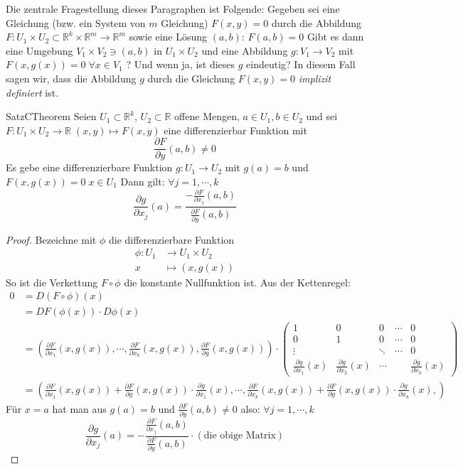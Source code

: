 Die zentrale Fragestellung dieses Paragraphen ist Folgende: Gegeben sei eine Gleichung (bzw. ein System von $ m $ Gleichung)
$ F (x,y) = 0 $ durch die Abbildung $ F: U_1 \times U_2 \subset \mathbb{R}^{k} \times \mathbb{R}^m  \to \mathbb{R}^m  $ sowie 
eine Lösung $ (a,b) $: $ F \left( a,b \right) = 0 $ Gibt es dann eine Umgebung $ V_1 \times V_2 \ni (a,b)  $ in $ U_1 \times U_2 $ 
und eine Abbildung $ g: V_1 \to V_2 $ mit $ F \left( x, g \left(x\right)  \right) = 0 \; \forall x \in  V_1 $ ? Und wenn ja, ist 
dieses $ g $ eindeutig? In diesem Fall sagen wir, dass die Abbildung $ g $ durch die Gleichung $ F (x,y) = 0 $ \textit{implizit
 definiert} ist. 
 \begin{ibox}[44]{Satz}{CTheorem}
     Seien $ U_1 \subset \mathbb{R}^{k},\, U_2 \subset \mathbb{R}  $ offene Mengen, $ a \in U_1, b \in U_2 $ und sei 
		 $ F: U_{1} \times U_2 \to \mathbb{R} \; (x,y) \mapsto F (x,y) $ eine differenzierbar Funktion mit 
		 $$ \frac{\partial F}{\partial y} (a,b) \neq 0 $$
		 Es gebe eine differenzierbare Funktion $ g: U_1 \to U_2  $ mit $ g (a) = b $ und $ F \left( x,g (x) \right) = 0 \; x \in U_1 $ 
		 Dann gilt: $ \forall j = 1, \cdots,  k $ 
		 $$ \frac{\partial g}{\partial x_j} (a) = \frac{ - \frac{\partial F}{\partial x_j} (a,b)}{ \frac{\partial F}{\partial y} (a,b)}  $$
 \end{ibox}
\begin{proof}
	Bezeichne mit $ \phi $ die differenzierbare Funktion 
	\begin{align*} \phi: U_1 &\to U_1 \times U_2 \\ x &\mapsto (x, g(x)) \end{align*}
So ist die Verkettung $ F \circ \phi $ die konstante Nullfunktion ist. Aus der Kettenregel:
\begin{align*}
	0 &= D \left( F \circ \phi \right)(x) \\
		&= D F (\phi(x)) \cdot D \phi \left(x\right)\\
		&= \left( \frac{\partial F}{\partial x_1} (x, g(x)) , \cdots, \frac{\partial F}{\partial x_k}  (x, g(x)), 
		\frac{\partial F}{\partial g}  (x, g(x))\right) \cdot \begin{pmatrix}
			1 &0 &0 &\cdots &0\\
			0 &1 &0 &\cdots &0\\
			\vdots & &\ddots &\cdots &0\\
			\frac{\partial g}{\partial x_1} (x) &\frac{\partial g}{\partial x_2} (x) &\cdots & &\frac{\partial g}{\partial x_k} (x) 
		\end{pmatrix}\\
		&= \left( \frac{\partial F}{\partial x_1} (x,g(x))+ \frac{\partial F}{\partial g} (x,g(x)) \cdot \frac{\partial g}{\partial x_1} 
		(x), \cdots, \frac{\partial F}{\partial x_k} (x,g(x))+ \frac{\partial F}{\partial g} (x,g(x)) \cdot \frac{\partial g}{\partial x_k}
		(x), \right) 	
 \end{align*}
Für $ x = a $ hat man aus $ g(a) = b $ und $ \frac{\partial F}{\partial y} (a,b) \neq 0  $ also: $ \forall j = 1, \cdots,  k $ 
$$ \frac{\partial g}{\partial x_j} (a) = - \frac{ \frac{\partial F}{\partial x_j} (a,b)}{ \frac{\partial F}{\partial y} (a,b)} \cdot
(\text{die obige Matrix})$$
\end{proof}
